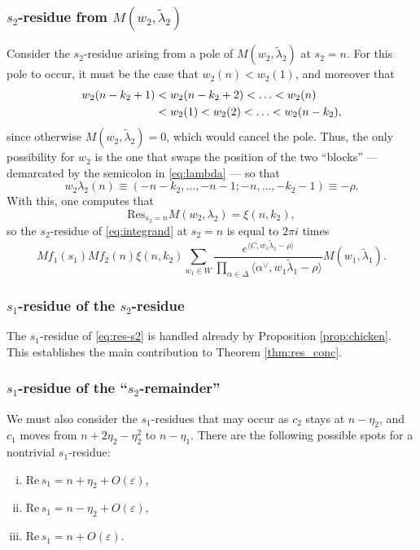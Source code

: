 \documentclass[11pt]{amsart}
\numberwithin{theorem}{section}
\numberwithin{equation}{section}
\theoremstyle{remark}
\theoremstyle{definition}
\newcommand{\re}{\mathrm{Re}\,}
\begin{document}
\subsubsection*{$s_2$-residue from $M(w_2,\tilde\lambda_2)$}

Consider the $s_2$-residue arising from a pole of $M(w_2,\tilde\lambda_2)$ at $s_2=n$. For this pole to occur, it must be the case that $w_2(n)<w_2(1)$, and moreover that
\begin{align} \label{eq:w*}
w_2(n-k_2+1) &< w_2(n-k_2+2) < \ldots < w_2(n) \\
&< w_2(1) < w_2(2) < \ldots < w_2(n-k_2), \notag
\end{align}
since otherwise $M(w_2,\tilde\lambda_2)=0$, which would cancel the pole. Thus, the only possibility for $w_2$ is the one that swaps the position of the two ``blocks'' --- demarcated by the semicolon in \eqref{eq:lambda} --- so that
\begin{equation*}
w_2\lambda_2(n) \equiv (-n-k_2,\ldots,-n-1;-n,\ldots,-k_2-1) \equiv -\rho.
\end{equation*}
With this, one computes that
\begin{equation*}
\mathrm{Res}_{s_2=n}M(w_2,\lambda_2) = \xi(n,k_2),
\end{equation*}
so the $s_2$-residue of \eqref{eq:integrand} at $s_2 = n$ is equal to $2\pi i$ times
\begin{equation}\label{eq:res-s2}
Mf_1(s_1)Mf_2(n)\xi(n,k_2)\sum_{w_1 \in W} \frac{e^{\langle C, w_1\tilde\lambda_1 - \rho\rangle}}{\prod_{\alpha \in \Delta}\langle \alpha^\vee,w_1\tilde\lambda_1 - \rho \rangle }M(w_1,\tilde\lambda_1).
\end{equation}

\subsubsection*{$s_1$-residue of the $s_2$-residue}

The $s_1$-residue of \eqref{eq:res-s2} is handled already by Proposition \ref{prop:chicken}. This establishes the main contribution to Theorem \ref{thm:res_conc}.

\subsubsection*{$s_1$-residue of the ``$s_2$-remainder''}

We must also consider the $s_1$-residues that may occur as $c_2$ stays at $n-\eta_2$, and $c_1$ moves from $n+2\eta_2-\eta_2^2$ to $n-\eta_1$. There are the following possible spots for a nontrivial $s_1$-residue: 
\begin{enumerate}[(i)]
\item $\re s_1 = n+\eta_2+O(\varepsilon)$,
\item $\re s_1 = n-\eta_2+O(\varepsilon)$,
\item $\re s_1 =n+O(\varepsilon)$.
\end{enumerate}
\end{document}
